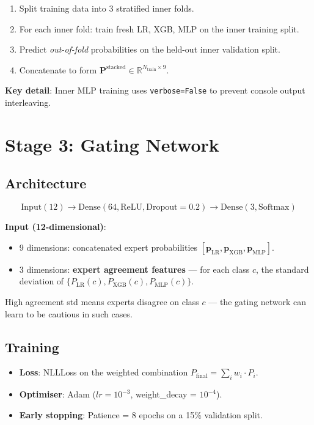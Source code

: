 \documentclass[12pt, a4paper]{article}
\begin{document}
\begin{enumerate}
  \item Split training data into 3 stratified inner folds.
  \item For each inner fold: train fresh LR, XGB, MLP on the inner training split.
  \item Predict \textit{out-of-fold} probabilities on the held-out inner validation split.
  \item Concatenate to form $\mathbf{P}^{\text{stacked}} \in \mathbb{R}^{N_{\text{train}} \times 9}$.
\end{enumerate}

\textbf{Key detail}: Inner MLP training uses \texttt{verbose=False} to prevent console output interleaving.

\section{Stage 3: Gating Network}

\subsection{Architecture}
\[
\text{Input}(12) \xrightarrow{} \text{Dense}(64, \text{ReLU}, \text{Dropout}=0.2) \xrightarrow{} \text{Dense}(3, \text{Softmax})
\]

\textbf{Input (12-dimensional)}:
\begin{itemize}
  \item 9 dimensions: concatenated expert probabilities $[\mathbf{p}_{\text{LR}}, \mathbf{p}_{\text{XGB}}, \mathbf{p}_{\text{MLP}}]$.
  \item 3 dimensions: \textbf{expert agreement features} — for each class $c$, the standard deviation of $\{P_{\text{LR}}(c), P_{\text{XGB}}(c), P_{\text{MLP}}(c)\}$.
\end{itemize}

High agreement std means experts disagree on class $c$ — the gating network can learn to be cautious in such cases.

\subsection{Training}
\begin{itemize}
  \item \textbf{Loss}: NLLLoss on the weighted combination $P_{\text{final}} = \sum_i w_i \cdot P_i$.
  \item \textbf{Optimiser}: Adam ($lr = 10^{-3}$, weight\_decay = $10^{-4}$).
  \item \textbf{Early stopping}: Patience = 8 epochs on a 15\% validation split.
\end{itemize}
\end{document}
